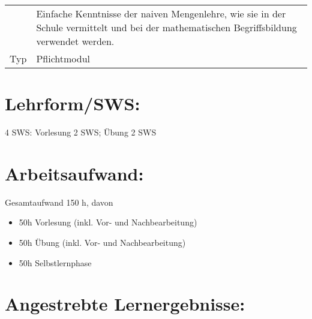 \begin{longtable}[]{@{}ll@{}}
\begin{minipage}[t]{0.12\columnwidth}
\end{minipage} & \begin{minipage}[t]{0.12\columnwidth}\raggedright\strut
Einfache Kenntnisse der naiven Mengenlehre, wie sie in der Schule
vermittelt und bei der mathematischen Begriffsbildung verwendet
werden.\strut
\end{minipage}\tabularnewline
\begin{minipage}[t]{0.12\columnwidth}\raggedright\strut
Typ\strut
\end{minipage} & \begin{minipage}[t]{0.12\columnwidth}\raggedright\strut
Pflichtmodul\strut
\end{minipage}\tabularnewline
\bottomrule
\end{longtable}

\section*{Lehrform/SWS:}\label{lehrformsws-24}

4 SWS: Vorlesung 2 SWS; Übung 2 SWS

\section*{Arbeitsaufwand:}\label{arbeitsaufwand-23}

Gesamtaufwand 150 h, davon

\begin{itemize}
\item
  50h Vorlesung (inkl. Vor- und Nachbearbeitung)
\item
  50h Übung (inkl. Vor- und Nachbearbeitung)
\item
  50h Selbstlernphase
\end{itemize}

\section*{Angestrebte
Lernergebnisse:}\label{angestrebte-lernergebnisse-24}

